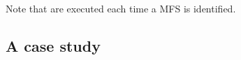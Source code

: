 \documentclass{sig-alternate}
\begin{document}
 Note that are executed each time a MFS is identified.






\subsection{A case study}
\end{document}
